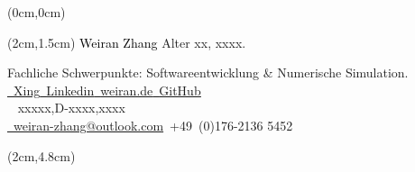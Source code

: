 \begin{textblock*}{21cm}(0cm,0cm)	
\end{textblock*}
\begin{textblock*}{21cm}(2cm,1.5cm)	
	\Huge \textcolor{black}{Weiran Zhang} 	\small Alter xx,  xxxx. %
	
 \vspace{0em}
 Fachliche Schwerpunkte: Softwareentwicklung \& Numerische Simulation. \\[0.5em]
  	\href{https://www.xing.com/profile/Weiran_Zhang4/cv}{\faXing~\underline{Xing}}\hspace{1em}\href{https://www.linkedin.com/in/weiran-zh/}{\faLinkedinSquare~\underline{Linkedin}}\hspace{1em}\href{weiran.de}{\faWordpress~\underline{weiran.de}}\hspace{0.7em}\href{https://github.com/joywezen/}{\faCodeFork ~\underline{GitHub}}\\[0.1em] \faMapMarker~ xxxxx,D-xxxx,xxxx\\
	\hspace{0em}\href{mailto:weiran-zhang@outlook.com}{\faEdit~weiran-zhang@outlook.com}\hspace{1em}\faPhoneSquare~+49~(0)176-2136 5452\\


\end{textblock*}
\begin{textblock*}{21cm}(2cm,4.8cm)	
\end{textblock*}


